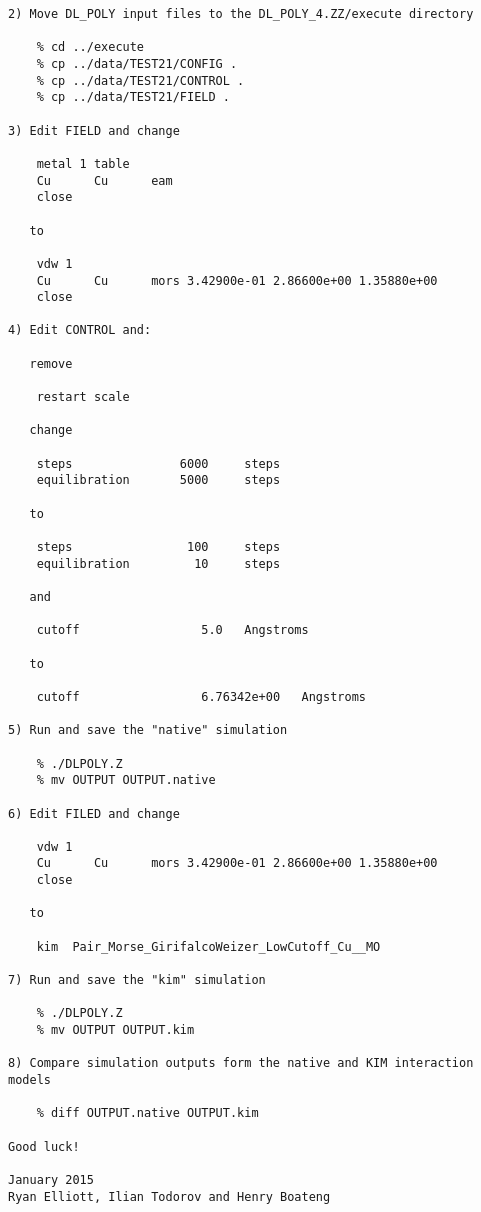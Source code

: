 \begin{verbatim}
2) Move DL_POLY input files to the DL_POLY_4.ZZ/execute directory

	% cd ../execute
	% cp ../data/TEST21/CONFIG .
	% cp ../data/TEST21/CONTROL .
	% cp ../data/TEST21/FIELD .

3) Edit FIELD and change

	metal 1 table
	Cu      Cu      eam
	close

   to

	vdw 1
	Cu      Cu      mors 3.42900e-01 2.86600e+00 1.35880e+00
	close

4) Edit CONTROL and:

   remove

	restart scale

   change

	steps               6000     steps
	equilibration       5000     steps

   to

	steps                100     steps
	equilibration         10     steps

   and

	cutoff                 5.0   Angstroms

   to

	cutoff                 6.76342e+00   Angstroms

5) Run and save the "native" simulation

	% ./DLPOLY.Z
	% mv OUTPUT OUTPUT.native

6) Edit FILED and change

	vdw 1
	Cu      Cu      mors 3.42900e-01 2.86600e+00 1.35880e+00
	close

   to

	kim  Pair_Morse_GirifalcoWeizer_LowCutoff_Cu__MO

7) Run and save the "kim" simulation

	% ./DLPOLY.Z
	% mv OUTPUT OUTPUT.kim

8) Compare simulation outputs form the native and KIM interaction models

	% diff OUTPUT.native OUTPUT.kim

Good luck!

January 2015
Ryan Elliott, Ilian Todorov and Henry Boateng
\end{verbatim}
